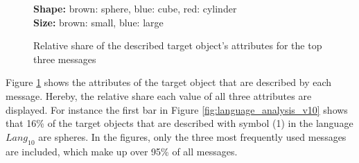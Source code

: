 \begin{figure}[ht]
    \centering
    \caption{Relative share of the described target object's attributes for the top three messages}

    \textbf{Shape:} brown: sphere, blue: cube, red: cylinder \\
    \textbf{Size:} brown: small, blue: large
    \label{fig:language_analysis_vocabularies}
\end{figure}


Figure \ref{fig:language_analysis_vocabularies} shows the attributes of the target object that are described by each message.
Hereby, the relative share each value of all three attributes are displayed.
For instance the first bar in Figure \ref{fig:language_analysis_v10} shows that 16\% of the target objects that are described with symbol (1) in the language $Lang_{10}$ are spheres.
In the figures, only the three most frequently used messages are included, which make up over 95\% of all messages.

